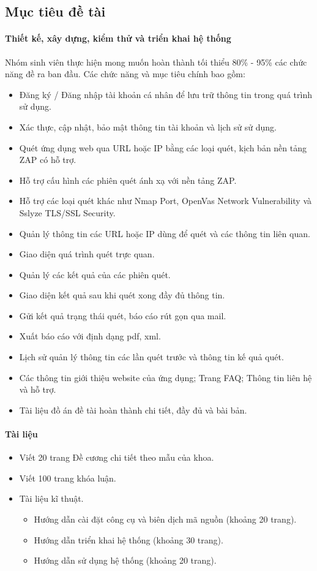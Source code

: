 \subsection{Mục tiêu đề tài}
\paragraph{Thiết kế, xây dựng, kiểm thử và triển khai hệ thống}
\tab Nhóm sinh viên thực hiện mong muốn hoàn thành tối thiểu 80\% - 95\% các chức năng đề ra ban đầu. Các chức năng và mục tiêu chính bao gồm:
\begin{itemize}
    \item Đăng ký / Đăng nhập tài khoản cá nhân để lưu trữ thông tin trong quá trình sử dụng.
    \item Xác thực, cập nhật, bảo mật thông tin tài khoản và lịch sử sử dụng.
    \item Quét ứng dụng web qua URL hoặc IP bằng các loại quét, kịch bản nền tảng ZAP có hỗ trợ.
    \item Hỗ trợ cấu hình các phiên quét ánh xạ với nền tảng ZAP.
    \item Hỗ trợ các loại quét khác như Nmap Port, OpenVas Network Vulnerability và Sslyze TLS/SSL Security.
    \item Quản lý thông tin các URL hoặc IP dùng để quét và các thông tin liên quan.
    \item Giao diện quá trình quét trực quan.
    \item Quản lý các kết quả của các phiên quét.
    \item Giao diện kết quả sau khi quét xong đầy đủ thông tin.
    \item Gửi kết quả trạng thái quét, báo cáo rút gọn qua mail.
    \item Xuất báo cáo với định dạng pdf, xml.
    \item Lịch sử quản lý thông tin các lần quét trước và thông tin kế quả quét.
    \item Các thông tin giới thiệu website của ứng dụng; Trang FAQ; Thông tin liên hệ và hỗ trợ.
    \item Tài liệu đồ án đề tài hoàn thành chi tiết, đầy đủ và bài bản.
\end{itemize}
\paragraph{Tài liệu}
\begin{itemize}
    \item Viết 20 trang Đề cương chi tiết theo mẫu của khoa.
    \item Viết 100 trang khóa luận.
    \item Tài liệu kĩ thuật.
    \begin{itemize}
        \item Hướng dẫn cài đặt công cụ và biên dịch mã nguồn (khoảng 20 trang).
        \item Hướng dẫn triển khai hệ thống (khoảng 30 trang).
        \item Hướng dẫn sử dụng hệ thống (khoảng 20 trang).
    \end{itemize}
\end{itemize}